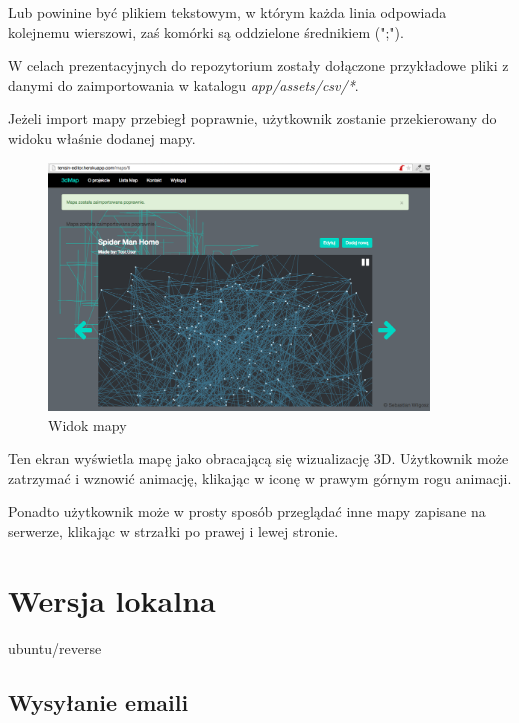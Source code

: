 Lub powinine być plikiem tekstowym, w którym każda linia odpowiada kolejnemu wierszowi, zaś komórki są oddzielone średnikiem (";").

W celach prezentacyjnych do repozytorium zostały dołączone przykładowe pliki z danymi do zaimportowania w katalogu \textit{app/assets/csv/*}.

Jeżeli import mapy przebiegł poprawnie, użytkownik zostanie przekierowany do widoku właśnie dodanej mapy.

\FloatBarrier
 	\begin{figure}[ht]
        \centering
        \includegraphics[width=0.90\textwidth,height=0.46\textheight]{img/add_map2.png}
	\caption{Widok mapy}
        \label{rys:screen_show_map}
    \end{figure}
\FloatBarrier

Ten ekran wyświetla mapę jako obracającą się wizualizację 3D. Użytkownik może zatrzymać i wznowić animację, klikając w iconę w prawym górnym rogu animacji.

Ponadto użytkownik może w prosty sposób przeglądać inne mapy zapisane na serwerze, klikając w strzałki po prawej i lewej stronie.

\section{Wersja lokalna}

ubuntu/reverse

\subsection{Wysyłanie emaili}
\label{dev_mailer}